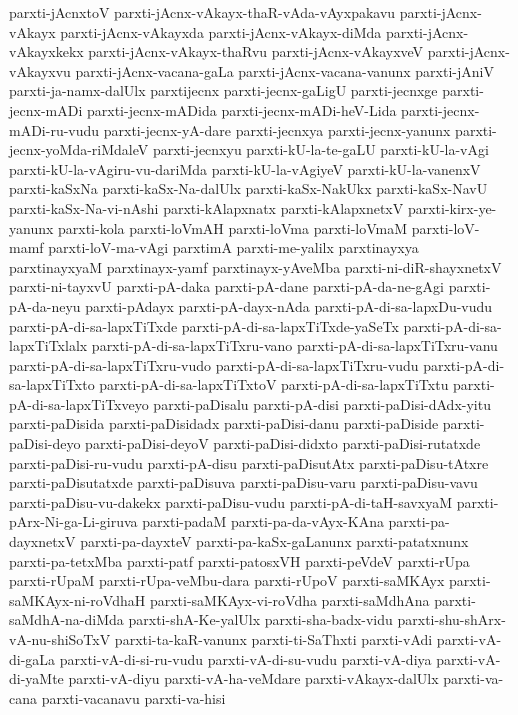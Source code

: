 {parxti-jAcnxtoV
parxti-jAcnx-vAkayx-thaR-vAda-vAyxpakavu
parxti-jAcnx-vAkayx
parxti-jAcnx-vAkayxda
parxti-jAcnx-vAkayx-diMda
parxti-jAcnx-vAkayxkekx
parxti-jAcnx-vAkayx-thaRvu
parxti-jAcnx-vAkayxveV
parxti-jAcnx-vAkayxvu
parxti-jAcnx-vacana-gaLa
parxti-jAcnx-vacana-vanunx
parxti-jAniV
parxti-ja-namx-dalUlx
parxtijecnx
parxti-jecnx-gaLigU
parxti-jecnxge
parxti-jecnx-mADi
parxti-jecnx-mADida
parxti-jecnx-mADi-heV-Lida
parxti-jecnx-mADi-ru-vudu
parxti-jecnx-yA-dare
parxti-jecnxya
parxti-jecnx-yanunx
parxti-jecnx-yoMda-riMdaleV
parxti-jecnxyu
parxti-kU-la-te-gaLU
parxti-kU-la-vAgi
parxti-kU-la-vAgiru-vu-dariMda
parxti-kU-la-vAgiyeV
parxti-kU-la-vanenxV
parxti-kaSxNa
parxti-kaSx-Na-dalUlx
parxti-kaSx-NakUkx
parxti-kaSx-NavU
parxti-kaSx-Na-vi-nAshi
parxti-kAlapxnatx
parxti-kAlapxnetxV
parxti-kirx-ye-yanunx
parxti-kola
parxti-loVmAH
parxti-loVma
parxti-loVmaM
parxti-loV-mamf
parxti-loV-ma-vAgi
parxtimA
parxti-me-yalilx
parxtinayxya
parxtinayxyaM
parxtinayx-yamf
parxtinayx-yAveMba
parxti-ni-diR-shayxnetxV
parxti-ni-tayxvU
parxti-pA-daka
parxti-pA-dane
parxti-pA-da-ne-gAgi
parxti-pA-da-neyu
parxti-pAdayx
parxti-pA-dayx-nAda
parxti-pA-di-sa-lapxDu-vudu
parxti-pA-di-sa-lapxTiTxde
parxti-pA-di-sa-lapxTiTxde-yaSeTx
parxti-pA-di-sa-lapxTiTxlalx
parxti-pA-di-sa-lapxTiTxru-vano
parxti-pA-di-sa-lapxTiTxru-vanu
parxti-pA-di-sa-lapxTiTxru-vudo
parxti-pA-di-sa-lapxTiTxru-vudu
parxti-pA-di-sa-lapxTiTxto
parxti-pA-di-sa-lapxTiTxtoV
parxti-pA-di-sa-lapxTiTxtu
parxti-pA-di-sa-lapxTiTxveyo
parxti-paDisalu
parxti-pA-disi
parxti-paDisi-dAdx-yitu
parxti-paDisida
parxti-paDisidadx
parxti-paDisi-danu
parxti-paDiside
parxti-paDisi-deyo
parxti-paDisi-deyoV
parxti-paDisi-didxto
parxti-paDisi-rutatxde
parxti-paDisi-ru-vudu
parxti-pA-disu
parxti-paDisutAtx
parxti-paDisu-tAtxre
parxti-paDisutatxde
parxti-paDisuva
parxti-paDisu-varu
parxti-paDisu-vavu
parxti-paDisu-vu-dakekx
parxti-paDisu-vudu
parxti-pA-di-taH-savxyaM
parxti-pArx-Ni-ga-Li-giruva
parxti-padaM
parxti-pa-da-vAyx-KAna
parxti-pa-dayxnetxV
parxti-pa-dayxteV
parxti-pa-kaSx-gaLanunx
parxti-patatxnunx
parxti-pa-tetxMba
parxti-patf
parxti-patosxVH
parxti-peVdeV
parxti-rUpa
parxti-rUpaM
parxti-rUpa-veMbu-dara
parxti-rUpoV
parxti-saMKAyx
parxti-saMKAyx-ni-roVdhaH
parxti-saMKAyx-vi-roVdha
parxti-saMdhAna
parxti-saMdhA-na-diMda
parxti-shA-Ke-yalUlx
parxti-sha-badx-vidu
parxti-shu-shArx-vA-nu-shiSoTxV
parxti-ta-kaR-vanunx
parxti-ti-SaThxti
parxti-vAdi
parxti-vA-di-gaLa
parxti-vA-di-si-ru-vudu
parxti-vA-di-su-vudu
parxti-vA-diya
parxti-vA-di-yaMte
parxti-vA-diyu
parxti-vA-ha-veMdare
parxti-vAkayx-dalUlx
parxti-va-cana
parxti-vacanavu
parxti-va-hisi
}
